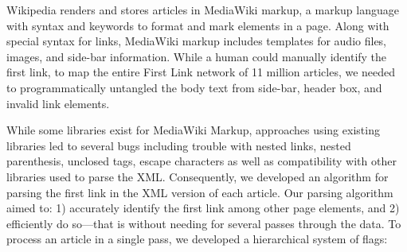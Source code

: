 \documentclass[pre,twocolumn,twoside,superscriptaddress,floatfix, aps, 10pt]{revtex4-1}
\begin{document}
Wikipedia renders and stores articles in MediaWiki markup, a markup language with syntax and keywords to format and mark elements in a page. Along with special syntax for links, MediaWiki markup includes templates for audio files, images, and side-bar
information.
While a human could manually identify the first link, to map the entire First Link network of 11 million articles, we needed to programmatically untangled the body text from side-bar, header box, and invalid link elements.

While some libraries exist for MediaWiki Markup,
approaches using existing libraries led to several bugs 
including trouble with nested links, nested parenthesis, unclosed tags, escape characters 
as well as compatibility with other libraries used to parse the XML.
Consequently,  we developed an algorithm for parsing the first link in the XML version of each article.
Our parsing algorithm aimed to: 
1) accurately identify the first link among other page elements, and 
2) efficiently do so---that is without needing for several passes through the data.
To process an article in a single pass, we developed a hierarchical system of flags:
\end{document}
